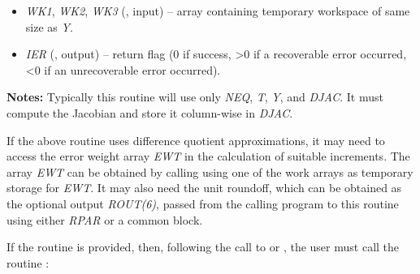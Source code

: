 \documentclass[letterpaper,10pt,english]{sphinxmanual}
\begin{document}
\begin{fulllineitems}
\begin{description}
\begin{itemize}
\item {} 
\emph{WK1}, \emph{WK2}, \emph{WK3}  (, input) -- array containing temporary workspace
of same size as \emph{Y}.

\item {} 
\emph{IER} (, output) -- return flag (0 if success, \textgreater{}0 if a recoverable error
occurred, \textless{}0 if an unrecoverable error occurred).

\end{itemize}

\end{description}

\textbf{Notes:} Typically this routine will use only \emph{NEQ}, \emph{T}, \emph{Y}, and
\emph{DJAC}. It must compute the Jacobian and store it column-wise in \emph{DJAC}.

\end{fulllineitems}


If the above routine uses difference quotient approximations, it may
need to access the error weight array \emph{EWT} in the calculation of
suitable increments. The array \emph{EWT} can be obtained by calling
{\hyperref[f_interface/Optional_output:f/_/FARKGETERRWEIGHTS]{}} using one of the work arrays as
temporary storage for \emph{EWT}. It may also need the unit roundoff, which
can be obtained as the optional output \emph{ROUT(6)}, passed from the
calling program to this routine using either \emph{RPAR} or a common block.

If the {\hyperref[f_interface/Usage:f/_/FARKDJAC]{}} routine is provided, then, following the
call to {\hyperref[f_interface/Usage:f/_/FARKDENSE]{}} or {\hyperref[f_interface/Usage:f/_/FARKLAPACKDENSE]{}}, the user
must call the routine {\hyperref[f_interface/Usage:f/_/FARKDENSESETJAC]{}}:
\end{document}
